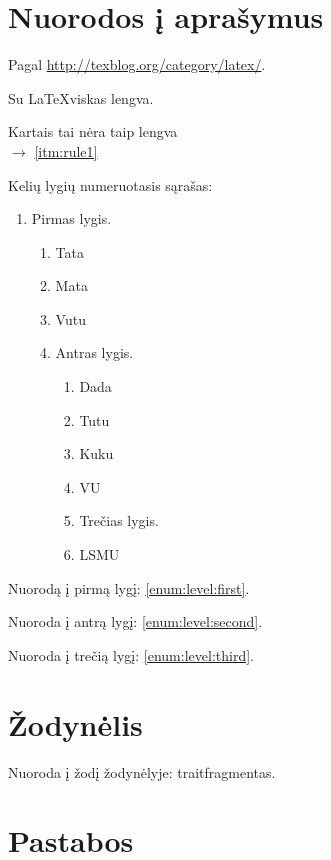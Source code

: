 \section{Nuorodos į aprašymus}

Pagal \url{http://texblog.org/category/latex/}.

\begin{description}[style=multiline, labelwidth=2.0cm]
	\item[\namedlabel{itm:rule1}{1 taisyklė}] Su \LaTeX viskas lengva.
	\item[\namedlabel{itm:rule2}{2 taisyklė}] Kartais tai nėra taip lengva\\
		$\to$ \ref{itm:rule1}
\end{description}

Kelių lygių numeruotasis sąrašas:
\begin{enumerate}
  \item \label{enum:level:first} Pirmas lygis.
    \begin{enumerate}
      \item Tata
      \item Mata
      \item Vutu
      \item \label{enum:level:second} Antras lygis.
        \begin{enumerate}
          \item Dada
          \item Tutu
          \item Kuku
          \item VU
          \item \label{enum:level:third} Trečias lygis.
          \item LSMU
        \end{enumerate}
    \end{enumerate}
\end{enumerate}

Nuorodą į pirmą lygį: \ref{enum:level:first}.

Nuoroda į antrą lygį: \ref{enum:level:second}.

Nuoroda į trečią lygį: \ref{enum:level:third}.

\section{Žodynėlis}

Nuoroda į žodį žodynėlyje: \gls{trait}{fragmentas}.

\section{Pastabos}

